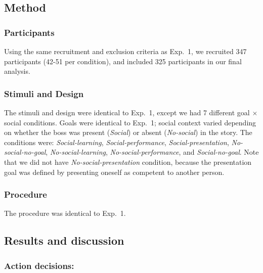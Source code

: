 \documentclass[10pt, letterpaper]{article}
\begin{document}
\subsection{Method}\label{method-1}

\subsubsection{Participants}\label{participants-1}

Using the same recruitment and exclusion criteria as Exp.~1, we
recruited 347 participants (42-51 per condition), and included 325
participants in our final analysis.

\subsubsection{Stimuli and Design}\label{stimuli-and-design-1}

The stimuli and design were identical to Exp.~1, except we had 7
different goal \(\times\) social conditions. Goals were identical to
Exp.~1; social context varied depending on whether the boss was present
(\emph{Social}) or absent (\emph{No-social}) in the story. The
conditions were: \emph{Social-learning}, \emph{Social-performance},
\emph{Social-presentation}, \emph{No-social-no-goal},
\emph{No-social-learning}, \emph{No-social-performance}, and
\emph{Social-no-goal}. Note that we did not have
\emph{No-social-presentation} condition, because the presentation goal
was defined by presenting oneself as competent to another person.

\subsubsection{Procedure}\label{procedure-1}

The procedure was identical to Exp.~1.

\subsection{Results and discussion}\label{results-and-discussion-1}

\subsubsection{Action decisions:}\label{action-decisions-1}
\end{document}
